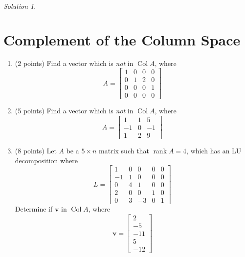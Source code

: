 \documentclass{article}
\theoremstyle{remark}
\newtheorem*{solution}{Solution}
\newcommand{\vv}[1]{\mathbf{#1}}
\DeclareMathOperator{\col}{Col}
\DeclareMathOperator{\rank}{rank}
\begin{document}
\medskip

\begin{solution}
\end{solution}

\pagebreak
\section{Complement of the Column Space}

\begin{enumerate}
\item (2 points) Find a vector which is \textit{not} in $\col A$, where
  \begin{displaymath}
    A =
    \begin{bmatrix}
      1 & 0 & 0 & 0 \\
      0 & 1 & 2 & 0 \\
      0 & 0 & 0 & 1 \\
      0 & 0 & 0 & 0
    \end{bmatrix}
  \end{displaymath}
\item (5 points) Find a vector which is \textit{not} in $\col A$, where
  \begin{displaymath}
    A =
    \begin{bmatrix}
      1 & 1 & 5 \\
      -1 & 0 & -1 \\
      1 & 2 & 9
    \end{bmatrix}
  \end{displaymath}
\item (8 points) Let $A$ be a $5 \times n$ matrix such that $\rank A = 4$, which has an LU decomposition where
  \begin{displaymath}
    L =
    \begin{bmatrix}
      1 & 0 & 0 & 0 & 0 \\
      -1 & 1 & 0 & 0 & 0\\
      0 & 4 & 1 & 0 & 0\\
      2 & 0 & 0 & 1 & 0 \\
      0 & 3 & -3 & 0 & 1
    \end{bmatrix}
  \end{displaymath}
  Determine if $\vv v$ in $\col A$, where
  \begin{displaymath}
    \vv v =
    \begin{bmatrix}
      2 \\ -5 \\ -11 \\ 5 \\ -12
    \end{bmatrix}
  \end{displaymath}

\end{enumerate}
\end{document}
